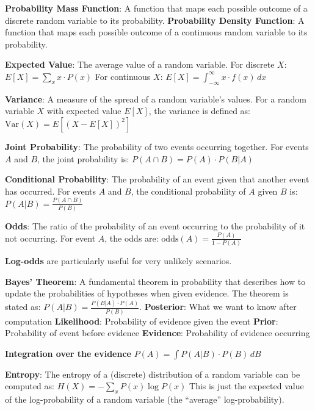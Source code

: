 \documentclass{article}
\begin{document}
\noindent \textbf{Probability Mass Function}: A function that maps each possible outcome of a discrete random variable to its probability.
\noindent \textbf{Probability Density Function}: A function that maps each possible outcome of a continuous random variable to its probability.


\noindent \textbf{Expected Value}: The average value of a random variable. For discrete $X$:
$ E[X] = \sum_{x} x \cdot P(x) $
For continuous $X$:
$ E[X] = \int_{-\infty}^{\infty} x \cdot f(x) \, dx $

\noindent \textbf{Variance}: A measure of the spread of a random variable's values. For a random variable $X$ with expected value $E[X]$, the variance is defined as:
$ \text{Var}(X) = E[(X - E[X])^2] $


\noindent \textbf{Joint Probability}: The probability of two events occurring together. For events $A$ and $B$, the joint probability is:
$ P(A \cap B) = P(A) \cdot P(B|A) $

\noindent \textbf{Conditional Probability}: The probability of an event given that another event has occurred. For events $A$ and $B$, the conditional probability of $A$ given $B$ is:
$ P(A|B) = \frac{P(A \cap B)}{P(B)} $

\noindent \textbf{Odds}: The ratio of the probability of an event occurring to the probability of it not occurring. For event $A$, the odds are:
$ \text{odds}(A) = \frac{P(A)}{1 - P(A)} $

\noindent \textbf{Log-odds} are particularly useful for very unlikely scenarios.

\noindent \textbf{Bayes' Theorem}: A fundamental theorem in probability that describes how to update the probabilities of hypotheses when given evidence. The theorem is stated as:
$ P(A|B) = \frac{P(B|A) \cdot P(A)}{P(B)} $.
\textbf{Posterior}: What we want to know after computation
\textbf{Likelihood}: Probability of evidence given the event
\textbf{Prior}: Probability of event before evidence
\textbf{Evidence}: Probability of evidence occurring

\noindent \textbf{Integration over the evidence}
$ P(A) = \int P(A|B) \cdot P(B) \, dB $

\noindent \textbf{Entropy}:
The entropy of a (discrete) distribution of a random variable can be
computed as:
$ H(X) = - \sum_{x} P(x) \log P(x) $
This is just the expected value of the log-probability of a random variable
(the “average” log-probability).

\end{document}
